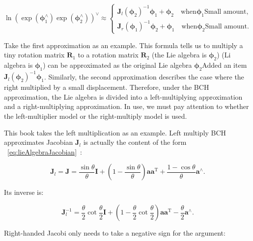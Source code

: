 \begin{equation}
  \ln { \left( {\exp \left( { \boldsymbol{\phi} _1^ \wedge } \right)\exp \left( {\boldsymbol{\phi} _2^ \wedge } \right)} \right) ^ \vee } \approx \left\{
    \begin{array}{l}
      {\bm{J}_l}{\left( {{\boldsymbol{\phi} _2}} \right)^{ - 1}}{ \boldsymbol{\phi} _1} + {\boldsymbol{\phi} _2} \quad \text{when} \boldsymbol{\phi}_1 \text{Small amount},\\
      {\bm{J}_r}{\left( {{\boldsymbol{\phi} _1}} \right)^{ - 1}}{\boldsymbol{\phi} _2} + {\boldsymbol{\phi} _1} \quad \text{when} \boldsymbol{\phi}_2 \text{Small amount}.
  \end{array} \right.
\end{equation}

Take the first approximation as an example. This formula tells us to multiply a tiny rotation matrix $\bm{R}_1$ to a rotation matrix $\bm{R}_2$ (the Lie algebra is $\boldsymbol{\phi}_2$) (Li algebra is $\boldsymbol{\phi} _1$) can be approximated as the original Lie algebra $\boldsymbol{\phi}_2$Added an item${\bm{J}_l}{\left( {{\boldsymbol{\phi} _2}} \right)^{ - 1}}{ \boldsymbol{\phi} _1}$. 
Similarly, the second approximation describes the case where the right multiplied by a small displacement. Therefore, under the BCH approximation, the Lie algebra is divided into a left-multiplying approximation and a right-multiplying approximation. In use, we must pay attention to whether the left-multiplier model or the right-multiply model is used.

This book takes the left multiplication as an example. Left multiply BCH approximates Jacobian $\bm{J}_l$ is actually the content of the form ~\eqref{eq:lieAlgebraJacobian}~:

\begin{equation} 
{ \bm{J}_l} = \bm{J} = \frac{{\sin \theta }}{\theta } \bm{I} + \left( {1 - \frac{{\sin \theta }}{\theta }} \right) \bm{a} { \bm{a}^\mathrm{T}} + \frac{{1 - \cos \theta }}{\theta }{ \bm{a}^ \wedge}.
\end{equation}

Its inverse is:

\begin{equation}
\bm{J}_l^{ - 1} = \frac{\theta }{2}\cot \frac{\theta }{2} \bm{I} + \left( {1 - \frac{\theta } {2}\cot \frac{\theta }{2}} \right) \bm{a} {\bm{a}^\mathrm{T}} - \frac{\theta }{2}{ \bm{ a}^ \wedge }.
\end{equation}

Right-handed Jacobi only needs to take a negative sign for the argument:

